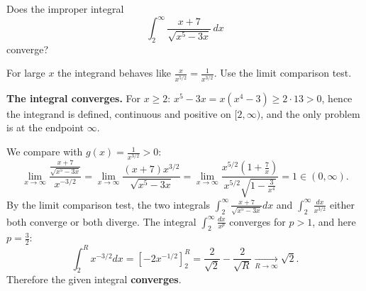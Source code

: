 
\begin{question}
Does the improper integral
\[ \int_2^\infty\frac{x+7}{\sqrt{x^5-3x}}\,dx \]
converge?
\end{question}

\begin{hint}
For large $x$ the integrand behaves like $\frac{x}{x^{5/2}}=\frac{1}{x^{3/2}}$. Use the limit comparison test.
\end{hint}

\begin{solution}
\textbf{The integral converges.}
For $x\ge2$: $x^5-3x=x(x^4-3)\ge2\cdot13>0$, hence the integrand is defined, continuous and positive on $[2,\infty)$, and the only problem is at the endpoint $\infty$.

We compare with $g(x)=\frac{1}{x^{3/2}}>0$:
\[ \lim_{x\to\infty}\frac{\frac{x+7}{\sqrt{x^5-3x}}}{x^{-3/2}}=\lim_{x\to\infty}\frac{(x+7)x^{3/2}}{\sqrt{x^5-3x}}=\lim_{x\to\infty}\frac{x^{5/2}\left(1+\frac7x\right)}{x^{5/2}\sqrt{1-\frac{3}{x^4}}}=1\in(0,\infty). \]
By the limit comparison test, the two integrals $\int_2^\infty\frac{x+7}{\sqrt{x^5-3x}}dx$ and $\int_2^\infty\frac{dx}{x^{3/2}}$ either both converge or both diverge. The integral $\int_2^\infty\frac{dx}{x^p}$ converges for $p>1$, and here $p=\frac32$:
\[ \int_2^R x^{-3/2}dx=\left[-2x^{-1/2}\right]_2^R=\frac{2}{\sqrt2}-\frac{2}{\sqrt R}\xrightarrow[R\to\infty]{}\sqrt2. \]
Therefore the given integral \textbf{converges}.
\end{solution}
